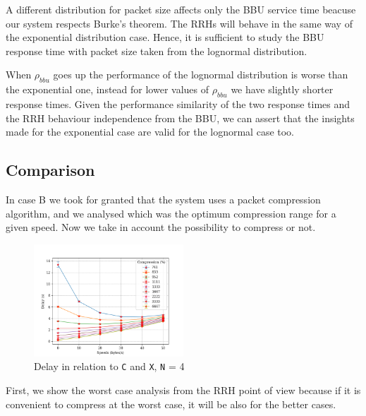 \documentclass[11pt,a4paper,oneside, openright]{article}
\begin{document}
A different distribution for packet size affects only the BBU service time beacuse our system respects Burke's theorem. The RRHs will behave in the same way of the exponential distribution case. Hence, it is sufficient to study the BBU response time with packet size taken from the lognormal distribution.


When $\rho_{bbu}$ goes up the performance of the lognormal distribution is worse than the exponential one, instead for lower values of $\rho_{bbu}$ we have slightly shorter response times. Given the performance similarity of the two response times and the RRH behaviour independence from the BBU, we can assert that the insights made for the exponential case are valid for the lognormal case too.
\newpage
\subsection{Comparison}
In case B we took for granted that the system uses a packet compression algorithm, and we analysed which was the optimum compression range for a given speed. Now we take in account the possibility to compress or not. 

\begin{figure}[h]
	\centering
	\includegraphics[width=0.5\textwidth]{images/c-vs-delay-n-4}
	\caption{Delay in relation to \texttt{C} and \texttt{X}, \texttt{N} = 4} 
	\label{fig:c-vs-delay-n-4}
\end{figure}

First, we show the worst case analysis from the RRH point of view because if it is convenient to compress at the worst case, it will be also for the better cases. 
\end{document}
